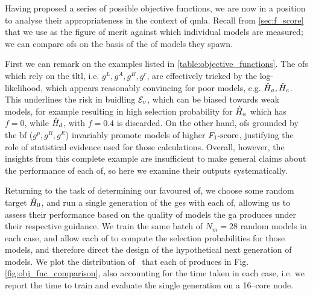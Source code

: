 Having proposed a series of possible objective functions, 
    we are now in a position to analyse their appropriateness in the context of \gls{qmla}. 
Recall from \cref{sec:f_score} that we use \fs as the figure of merit against which individual models are measured;
    we can compare \glspl{of} on the basis of the \fs of models they spawn.

\par 

First we can remark on the examples listed in \cref{table:objective_functions}. 
The \glspl{of} which rely on the \gls{tltl}, i.e. $g^L, g^A, g^B, g^r$, 
    are effectively tricked by the log-likelihood, which appears reasonably convincing for 
    poor models, e.g. $\hat{H}_a, \hat{H}_c$. 
This underlines the risk in buidling ${ \mathcal{E} }_v$, which can be biased towards weak models, 
    for example resulting in high selection probability for $\hat{H}_a$ which has $f=0$, 
    while $\hat{H}_d$, with $f=0.4$ is discarded. 
On the other hand, \glspl{of} grounded by the \gls{bf} ($g^p, g^R, g^E$) invariably 
    promote models of higher $ F_{1}\text{-score} $, justifying the role of statistical evidence 
    used for those calculations. 
Overall, however, the insights from this complete example are insufficient to 
    make general claims about the performance of each \gls{of}, 
    so here we examine their outputs systematically. 
\par 

Returning to the task of determining our favoured \gls{of}, 
    we choose some random target $\hat{H}_0$, and run a single generation of the \gls{ges} with each \gls{of}, 
    allowing us to assess their performance based on the quality of models the \gls{ga} 
    produces under their respective guidance.
We train the same batch of $N_m=28$ random models in each case, and allow each \gls{of} 
    to compute the selection probabilities for those models, 
    and therefore direct the design of the hypothetical next generation of models. 
We plot the distribution of \fs \ that each \gls{of} produces in Fig. \ref{fig:obj_fnc_comparison},
    also accounting for the time taken in each case, i.e. 
    we report the time to train and evaluate the single generation on a 16--core node.
\par

